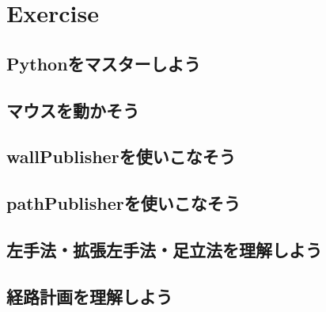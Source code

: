 \documentclass[11pt,a4paper]{jsarticle}
\begin{document}
\section{Exercise}
\subsection{Pythonをマスターしよう}


\newpage
\subsection{マウスを動かそう}




\newpage



\newpage





\newpage
\subsection{wallPublisherを使いこなそう}




\newpage
\subsection{pathPublisherを使いこなそう}




\newpage
\subsection{左手法・拡張左手法・足立法を理解しよう}




\newpage





\newpage
\subsection{経路計画を理解しよう}
\end{document}
